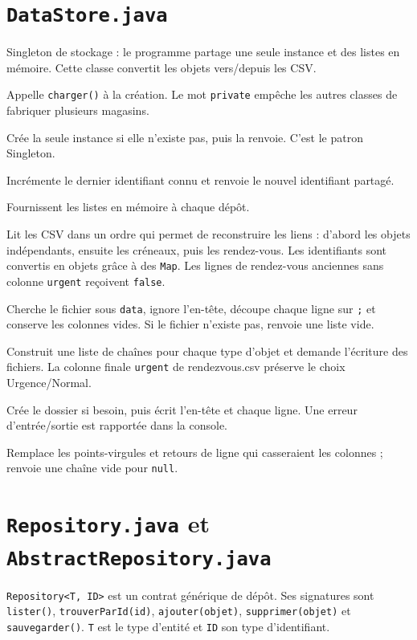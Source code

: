 \documentclass[11pt,a4paper]{report}
\begin{document}
\section{\texttt{DataStore.java}}
Singleton de stockage : le programme partage une seule instance et des listes en mémoire. Cette classe convertit les objets vers/depuis les CSV.
\begin{description}[leftmargin=4.4cm,style=nextline]
\item[Constructeur privé \texttt{DataStore()}] Appelle \texttt{charger()} à la création. Le mot \texttt{private} empêche les autres classes de fabriquer plusieurs magasins.
\item[\texttt{getInstance()}] Crée la seule instance si elle n'existe pas, puis la renvoie. C'est le patron Singleton.
\item[\texttt{nouvelId()}] Incrémente le dernier identifiant connu et renvoie le nouvel identifiant partagé.
\item[\texttt{getAdministrateurs()}, \texttt{getPatients()}, \texttt{getDentistes()}, \texttt{getActes()}, \texttt{getCreneaux()}, \texttt{getRendezVous()}] Fournissent les listes en mémoire à chaque dépôt.
\item[\texttt{charger()}] Lit les CSV dans un ordre qui permet de reconstruire les liens : d'abord les objets indépendants, ensuite les créneaux, puis les rendez-vous. Les identifiants sont convertis en objets grâce à des \texttt{Map}. Les lignes de rendez-vous anciennes sans colonne \texttt{urgent} reçoivent \texttt{false}.
\item[\texttt{lireFichier(nom)}] Cherche le fichier sous \texttt{data}, ignore l'en-tête, découpe chaque ligne sur \texttt{;} et conserve les colonnes vides. Si le fichier n'existe pas, renvoie une liste vide.
\item[\texttt{sauvegarder()}] Construit une liste de chaînes pour chaque type d'objet et demande l'écriture des fichiers. La colonne finale \texttt{urgent} de rendezvous.csv préserve le choix Urgence/Normal.
\item[\texttt{ecrireFichier(nom, entete, lignes)}] Crée le dossier si besoin, puis écrit l'en-tête et chaque ligne. Une erreur d'entrée/sortie est rapportée dans la console.
\item[\texttt{texte(valeur)}] Remplace les points-virgules et retours de ligne qui casseraient les colonnes ; renvoie une chaîne vide pour \texttt{null}.
\end{description}

\section{\texttt{Repository.java} et \texttt{AbstractRepository.java}}
\texttt{Repository<T, ID>} est un contrat générique de dépôt. Ses signatures sont \texttt{lister()}, \texttt{trouverParId(id)}, \texttt{ajouter(objet)}, \texttt{supprimer(objet)} et \texttt{sauvegarder()}. \texttt{T} est le type d'entité et \texttt{ID} son type d'identifiant.
\end{document}
